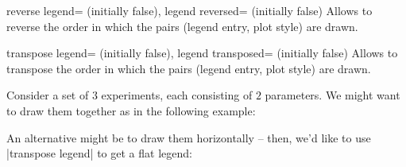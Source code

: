 \begin{pgfplotskeylist}{%
	reverse legend= (initially false),%
	legend reversed= (initially false)}
	Allows to reverse the order in which the pairs (legend entry, plot style) are drawn.
\begin{codeexample}[]
\end{codeexample}
\end{pgfplotskeylist}

\begin{pgfplotskeylist}{%
	transpose legend= (initially false),%
	legend transposed= (initially false)}
	Allows to transpose the order in which the pairs (legend entry, plot style) are drawn. 
	
	Consider a set of $3$ experiments, each consisting of $2$ parameters. We might want to draw them together as in the following example:
\begin{codeexample}[]
\end{codeexample}

	An alternative might be to draw them horizontally -- then, we'd like to use |transpose legend| to get a flat legend:
\begin{codeexample}[]
\end{codeexample}
\end{pgfplotskeylist}
